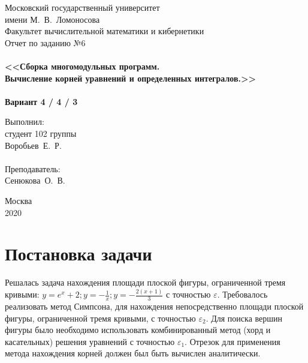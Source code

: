 \documentclass[a4paper,12pt,titlepage,finall]{article}
\begin{document}
\begin{titlepage}
    \begin{center}
    {\small \sc Московский государственный университет \\имени М.~В.~Ломоносова\\
    Факультет вычислительной математики и кибернетики\\}
    \vfill
    {\Large \sc Отчет по заданию №6}\\
    ~\\
    {\large \bf <<Сборка многомодульных программ. \\
    Вычисление корней уравнений и определенных интегралов.>>}\\ 
    ~\\
    {\large \bf Вариант 4 / 4 / 3}
    \end{center}
    \begin{flushright}
    \vfill {Выполнил:\\
    студент 102 группы\\
    Воробьев~Е.~Р.\\
    ~\\
    Преподаватель:\\
    Сенюкова~О.~В.}
    \end{flushright}
    \begin{center}
    \vfill
    {\small Москва\\2020}
    \end{center}
\end{titlepage}

\tableofcontents
\newpage

\section{Постановка задачи}

Решалась задача нахождения площади плоской фигуры, ограниченной тремя кривыми: $y = e^x+2; y = -\frac{1}{x}; y = -\frac{2(x+1)}{3}$ с точностью $\varepsilon$. Требовалось реализовать метод Симпсона, для нахождения непосредственно площади плоской фигуры, ограниченной тремя кривыми, с точностью $\varepsilon_2$. Для поиска вершин фигуры было необходимо использовать комбинированный метод (хорд и касательных) решения уравнений с точностью $\varepsilon_1$. Отрезок для применения метода нахождения корней должен был быть вычислен аналитически.\par

\newpage
\end{document}
